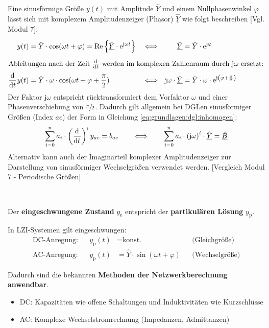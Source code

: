\begin{frame}
{    Eine sinusförmige Größe $y(t)$ mit Amplitude $\hat{Y}$ und einem Nullphasenwinkel $\varphi$ lässt sich mit komplexem Amplitudenzeiger (Phasor) $\underline{\hat{Y}}$ 
    wie folgt beschreiben [Vgl. Modul 7]:
    \begin{align*}
        y(t) &= \hat{Y} \cdot \cos(\omega t + \varphi) = \operatorname{Re}\left\{ \underline{\hat{Y}} \cdot \mathrm{e}^{\mathrm{j} \omega t} \right\} &
            &\Longleftrightarrow& 
            \underline{\hat{Y}} &= \hat{Y} \cdot \mathrm{e}^{\mathrm{j} \varphi} 
            \vphantom{\bigg|}\\
    \intertext{Ableitungen nach der Zeit $\frac{\mathrm{d}^{{}}}{\mathrm{d}t^{{}}}$ werden im komplexen Zahlenraum durch $\mathrm{j} \omega$ ersetzt:}
        \frac{\mathrm{d}^{{}}}{\mathrm{d}t^{{}}} y(t) &= \hat{Y} \cdot \omega \cdot \cos(\omega t + \varphi + \frac{\pi}{2}) &
            &\Longleftrightarrow& 
            \mathrm{j} \omega \cdot  \underline{\hat{Y}} &= \hat{Y} \cdot \omega \cdot \mathrm{e}^{\mathrm{j} \left(\varphi + \frac{\pi}{2}\right)}
    \end{align*}
    Der Faktor $\mathrm{j}\omega$ entspricht rücktransformiert dem Vorfaktor $\omega$ und einer Phasenverschiebung von $\sfrac{\pi}{2}$. 
    Dadurch gilt allgemein bei DGLen sinusförmiger Größen (Index $ac$) der Form in Gleichung \ref{eq:grundlagen:dgl:inhomogen}: 
    \begin{equation}
        \sum_{i=0}^n a_i \cdot \left(\frac{\mathrm{d}^{{}}}{\mathrm{d}t^{{}}}\right)^i y_{ac} = b_{ac}
        \qquad \Longleftrightarrow \qquad 
        \sum_{i=0}^n a_i \cdot \left(\mathrm{j}\omega\right)^i \cdot \underline{\hat{Y}} = \underline{\hat{B}}
        \label{eq:grundlagen:dgl:komplex}
    \end{equation}
    Alternativ kann auch der Imaginärteil komplexer Amplitudenzeiger zur Darstellung von sinusförmiger Wechselgrößen verwendet werden. 
    [Vergleich Modul 7 - Periodische Größen]

}%
\b{%
    Der \textbf{eingeschwungene Zustand} $y_{\mathrm{e}}$ entspricht der \textbf{partikulären Lösung} $y_{\mathrm{p}}$.
    \vspace{2mm}

    In LZI-Systemen gilt eingeschwungen:
    \begin{align*}
        \text{DC-Anregung:} && y_{\mathrm{p}}(t) &= \text{konst.} &&\text{(Gleichgröße)}\\
        \text{AC-Anregung:} && y_{\mathrm{p}}(t) &= \hat{Y} \cdot \sin(\omega t + \varphi) &&\text{(Wechselgröße)}
    \end{align*}

    Dadurch sind die bekannten \textbf{Methoden der Netzwerkberechnung anwendbar}.
    \vspace{2mm}

    \begin{itemize}
        \item[] DC: Kapazitäten wie offene Schaltungen und Induktivitäten wie Kurzschlüsse
        \item[] AC: Komplexe Wechselstromrechnung (Impedanzen, Admittanzen)
    \end{itemize}
}
\end{frame}
